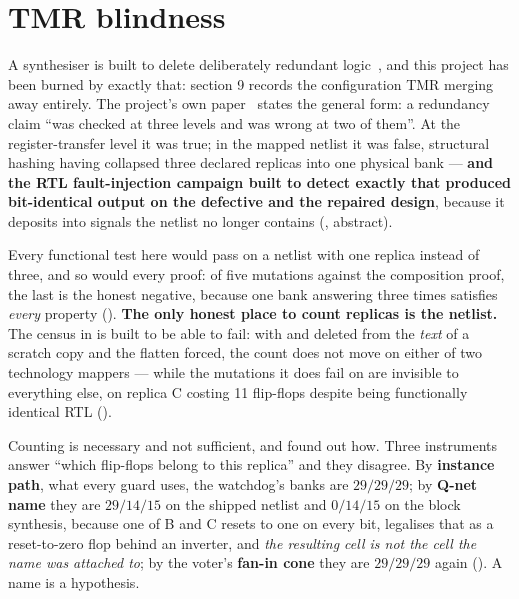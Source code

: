 \section{TMR blindness}
\label{sec:harden-blind}

A synthesiser is built to delete deliberately redundant
logic~\cite{esa_ftmr}, and this
project has been burned by exactly that:  section 9
records the configuration TMR merging away entirely. The project's own
paper~\cite{companion_tmr} states the general form: a redundancy claim ``was checked at three
levels and was wrong at two of them''. At the register-transfer level it
was true; in the mapped netlist it was false, structural hashing having
collapsed three declared replicas into one physical bank --- \textbf{and
the RTL fault-injection campaign built to detect exactly that produced
bit-identical output on the defective and the repaired design}, because
it deposits into signals the netlist no longer contains
(, abstract).

Every functional test here would pass on a netlist with one replica
instead of three, and so would every proof: of five mutations against
the composition proof, the last is the honest negative, because one bank
answering three times satisfies \emph{every} property
(). \textbf{The only honest place to count
replicas is the netlist.} The census in
 is built to be able to
fail: with  and  deleted from the
\emph{text} of a scratch copy and the flatten forced, the count does not
move on either of two technology mappers --- while the mutations it does
fail on are invisible to everything else,  on replica C
costing 11 flip-flops despite being functionally identical RTL
().

Counting is necessary and not sufficient, and  found out how.
Three instruments answer ``which flip-flops belong to this replica'' and
they disagree. By \textbf{instance path}, what every guard uses, the
watchdog's banks are $29/29/29$; by \textbf{Q-net name} they are
$29/14/15$ on the shipped netlist and $0/14/15$ on the block synthesis,
because one of B and C resets to one on every bit,
 legalises that as a reset-to-zero flop behind an
inverter, and \emph{the resulting cell is not the cell the name was
attached to}; by the voter's
\textbf{fan-in cone} they are $29/29/29$ again
(). A name is a hypothesis.

